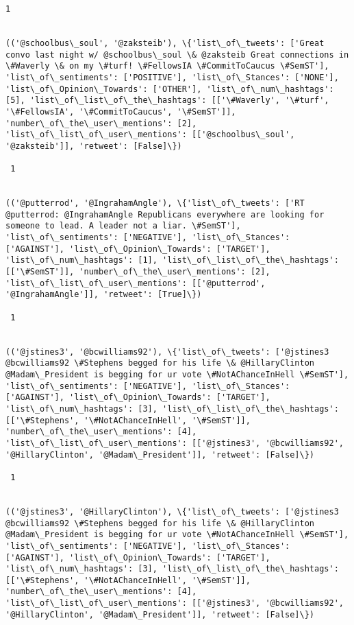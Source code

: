 \documentclass[11pt]{article}
\begin{document}
\begin{Verbatim}[commandchars=\\\{\}]
 1
 

(('@schoolbus\_soul', '@zaksteib'), \{'list\_of\_tweets': ['Great convo last night w/ @schoolbus\_soul \& @zaksteib Great connections in \#Waverly \& on my \#turf! \#FellowsIA \#CommitToCaucus \#SemST'], 'list\_of\_sentiments': ['POSITIVE'], 'list\_of\_Stances': ['NONE'], 'list\_of\_Opinion\_Towards': ['OTHER'], 'list\_of\_num\_hashtags': [5], 'list\_of\_list\_of\_the\_hashtags': [['\#Waverly', '\#turf', '\#FellowsIA', '\#CommitToCaucus', '\#SemST']], 'number\_of\_the\_user\_mentions': [2], 'list\_of\_list\_of\_user\_mentions': [['@schoolbus\_soul', '@zaksteib']], 'retweet': [False]\})

 1
 

(('@putterrod', '@IngrahamAngle'), \{'list\_of\_tweets': ['RT @putterrod: @IngrahamAngle Republicans everywhere are looking for someone to lead. A leader not a liar. \#SemST'], 'list\_of\_sentiments': ['NEGATIVE'], 'list\_of\_Stances': ['AGAINST'], 'list\_of\_Opinion\_Towards': ['TARGET'], 'list\_of\_num\_hashtags': [1], 'list\_of\_list\_of\_the\_hashtags': [['\#SemST']], 'number\_of\_the\_user\_mentions': [2], 'list\_of\_list\_of\_user\_mentions': [['@putterrod', '@IngrahamAngle']], 'retweet': [True]\})

 1
 

(('@jstines3', '@bcwilliams92'), \{'list\_of\_tweets': ['@jstines3 @bcwilliams92 \#Stephens begged for his life \& @HillaryClinton @Madam\_President is begging for ur vote \#NotAChanceInHell \#SemST'], 'list\_of\_sentiments': ['NEGATIVE'], 'list\_of\_Stances': ['AGAINST'], 'list\_of\_Opinion\_Towards': ['TARGET'], 'list\_of\_num\_hashtags': [3], 'list\_of\_list\_of\_the\_hashtags': [['\#Stephens', '\#NotAChanceInHell', '\#SemST']], 'number\_of\_the\_user\_mentions': [4], 'list\_of\_list\_of\_user\_mentions': [['@jstines3', '@bcwilliams92', '@HillaryClinton', '@Madam\_President']], 'retweet': [False]\})

 1
 

(('@jstines3', '@HillaryClinton'), \{'list\_of\_tweets': ['@jstines3 @bcwilliams92 \#Stephens begged for his life \& @HillaryClinton @Madam\_President is begging for ur vote \#NotAChanceInHell \#SemST'], 'list\_of\_sentiments': ['NEGATIVE'], 'list\_of\_Stances': ['AGAINST'], 'list\_of\_Opinion\_Towards': ['TARGET'], 'list\_of\_num\_hashtags': [3], 'list\_of\_list\_of\_the\_hashtags': [['\#Stephens', '\#NotAChanceInHell', '\#SemST']], 'number\_of\_the\_user\_mentions': [4], 'list\_of\_list\_of\_user\_mentions': [['@jstines3', '@bcwilliams92', '@HillaryClinton', '@Madam\_President']], 'retweet': [False]\})


\end{Verbatim}
\end{document}
